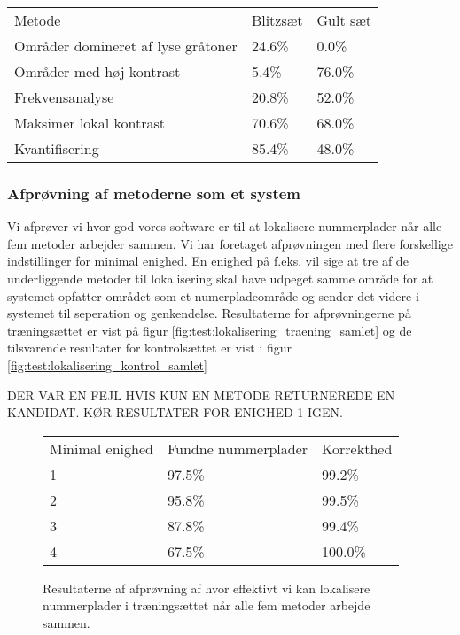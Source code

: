 \begin{center}
\begin{tabular}{|l|l|l|}
\hline
\rowcolor[gray]{0.9} \multicolumn{3}{|>{\columncolor[gray]{0.9}}c|}{\textbf{..}} \\ \hline
Metode & Blitzsæt & Gult sæt\\ \hline
Områder domineret af lyse gråtoner &  24.6\% & 0.0\%\\ \hline
Områder med høj kontrast & 5.4\% & 76.0\%\\ \hline
Frekvensanalyse &  20.8\% & 52.0\%\\ \hline
Maksimer lokal kontrast &  70.6\% & 68.0\%\\ \hline
Kvantifisering &  85.4\% & 48.0\%\\
\hline
\end{tabular}
\end{center}


\subsubsection{Afprøvning af metoderne som et system}
Vi afprøver vi hvor god vores software er til at lokalisere nummerplader når alle fem metoder arbejder sammen. Vi har foretaget afprøvningen med flere forskellige indstillinger for minimal enighed. En enighed på f.eks. vil sige at tre af de underliggende metoder til lokalisering skal have udpeget samme område for at systemet opfatter området som et numerpladeområde og sender det videre i systemet til seperation og genkendelse. Resultaterne for afprøvningerne på træningsættet er vist på figur \vref{fig:test:lokalisering_traening_samlet} og de tilsvarende resultater for kontrolsættet er vist i figur \ref{fig:test:lokalisering_kontrol_samlet}

DER VAR EN FEJL HVIS KUN EN METODE RETURNEREDE EN KANDIDAT. KØR RESULTATER FOR ENIGHED 1 IGEN.

\begin{figure}[htp]
\centering
  \begin{tabular}{|l|l|l|}
    \hline
    \rowcolor[gray]{0.9} \multicolumn{3}{|>{\columncolor[gray]{0.9}}c|}{\textbf{Træningssæt}} \\
    \hline
    Minimal enighed & Fundne nummerplader & Korrekthed\\ \hline
    1 &  97.5\% & 99.2\%\\ \hline
    2 &  95.8\% & 99.5\%\\ \hline
    3 &  87.8\% & 99.4\%\\ \hline
    4 &  67.5\% & 100.0\%\\ \hline
  \end{tabular}
\caption{Resultaterne af afprøvning af hvor effektivt vi kan lokalisere nummerplader i træningsættet når alle fem metoder arbejde sammen.}
\label{fig:test:lokalisering_traening_samlet}
\end{figure}


